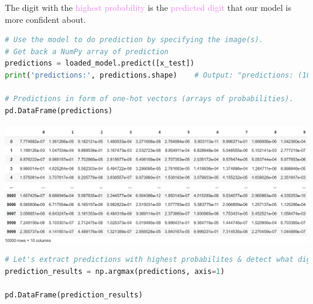\documentclass{book}
\begin{document}
The digit with the \textcolor{violet}{highest probability} is the \textcolor{violet}{predicted digit} that our model is more confident about.\\
\begin{lstlisting}[language=Python, basicstyle=\ttfamily\small, keywordstyle=\color{blue}, commentstyle=\color{forestgreen}, stringstyle=\color{red}, showstringspaces=false]
# Use the model to do prediction by specifying the image(s). 
# Get back a NumPy array of prediction
predictions = loaded_model.predict([x_test])
print('predictions:', predictions.shape)    # Output: "predictions: (10000, 10)"

# Predictions in form of one-hot vectors (arrays of probabilities).
pd.DataFrame(predictions)
\end{lstlisting}
\begin{center}
    \includegraphics[scale=0.24]{chapter 7/ch7_figure17.jpeg}
\end{center}
\newpage
\begin{lstlisting}[language=Python, basicstyle=\ttfamily\small, keywordstyle=\color{blue}, commentstyle=\color{forestgreen}, stringstyle=\color{red}, showstringspaces=false]
# Let's extract predictions with highest probabilites & detect what digits have been recognized
prediction_results = np.argmax(predictions, axis=1)

pd.DataFrame(prediction_results)
\end{lstlisting}
\end{document}
